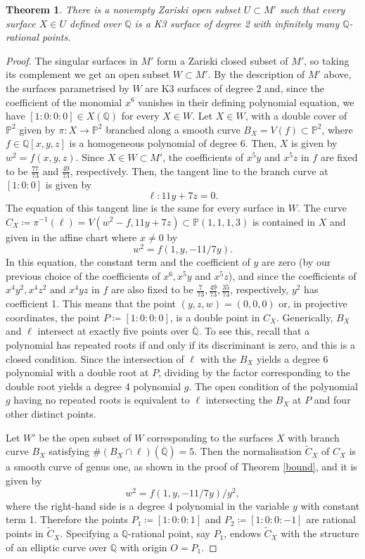 \documentclass[11pt]{amsart}
\newcommand{\QQ}{\mathbb{Q}}
\newcommand{\PP}{\mathbb{P}}
\theoremstyle{plain}
\newtheorem{theorem}[lemma]{Theorem}
\theoremstyle{remark}
\begin{document}
\begin{theorem}\label{infpts}
There is a nonempty Zariski open subset $U\subset M'$ such that every surface $X\in U$ defined over $\QQ$ is a K3 surface of degree 2 with infinitely many $\QQ$-rational points.
\end{theorem}
\begin{proof}
The singular surfaces in $M'$ form a Zariski closed subset of $M'$, so taking its complement we get an open subset $W\subset M'$. By the description of $M'$ above, the surfaces parametrised by $W$ are K3 surfaces of degree 2 and, since the coefficient of the monomial $x^6$ vanishes in their defining polynomial equation, we have $[1:0:0:0]\in X(\QQ)$ for every $X\in W$. Let $X\in W$, with a double cover of $\PP^2$ given by $\pi: X \rightarrow \PP^2$ 
branched along a smooth curve $B_X=V(f)\subset \PP^2$, where $f\in \QQ[x,y,z]$ is a homogeneous polynomial of degree 6. Then, $X$ is given by $w^2=f(x,y,z)$. Since $X\in W \subset M'$, the coefficients of $x^5y$ and $x^5z$ in $f$ are fixed to be $\frac{77}{73}$ and $\frac{49}{73}$, respectively. Then, the tangent line to the branch curve at $[1:0:0]$ is given by
\[
\ell: 11y + 7z = 0.
\]
The equation of this tangent line is the same for every surface in $W$. The curve $C_X\coloneqq \pi^{-1}(\ell)=V(w^2-f, 11y+7z)\subset\PP(1,1,1,3)$ is contained in $X$ and given in the affine chart where $x\neq 0$ by 
\[
w^2=f(1,y,-11/7y).
\] 
In this equation, the constant term and the coefficient of $y$ are zero (by our previous choice of the coefficients of $x^6, x^5y$ and $x^5z$), and since the coefficients of $x^4y^2, x^4z^2$ and $x^4yz$ in $f$ are also fixed to be $\frac{7}{73}, \frac{49}{73}, \frac{35}{73}$, respectively, $y^2$ has coefficient 1. This means that the point $(y,z,w)=(0,0,0)$ or, in projective coordinates, the point $P\coloneqq [1:0:0:0]$, is a double point in $C_X$.  
Generically, $B_X$ and $\ell$ intersect at exactly five points over $\overline{\QQ}$. 
To see this, recall that a polynomial has repeated roots if and only if its discriminant is zero, and this is a closed condition. Since the intersection of $\ell$ with the $B_X$ yields a degree 6 polynomial with a double root at $P$, dividing by the factor corresponding to the double root yields a degree 4 polynomial $g$. The open condition of the polynomial $g$ having no repeated roots is equivalent to $\ell$ intersecting the $B_X$ at $P$ and four other distinct points.

Let $W'$ be the open subset of $W$ corresponding to the surfaces $X$ with branch curve $B_X$ satisfying $\#(B_X\cap \ell)(\overline{\QQ})=5$. Then the normalisation $\widetilde{C}_X$ of $C_X$ is a smooth curve of genus one, as shown in the proof of Theorem \ref{bound}, and it is given by
\[
w^2=f(1,y,-11/7y)/y^2,
\]
where the right-hand side is a degree 4 polynomial in the variable $y$ with constant term 1. Therefore the points $P_1\coloneqq [1:0:0:1]$ and $P_2\coloneqq [1:0:0:-1]$ are rational points in $\widetilde{C}_X$. Specifying a $\QQ$-rational point, say $P_1$, endows $\widetilde{C}_X$ with the structure of an elliptic curve over $\QQ$ with origin $O=P_1$.   


\end{proof}
\end{document}
